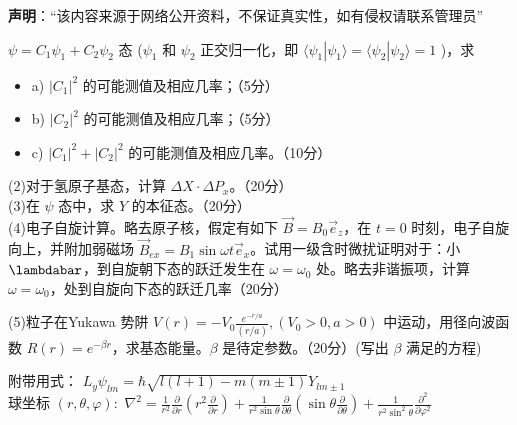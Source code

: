 
\textbf{声明}：“该内容来源于网络公开资料，不保证真实性，如有侵权请联系管理员”

\begin{enumerate}
     $\psi = C_1 \psi_1 + C_2 \psi_2$ 态 ($\psi_1$ 和 $\psi_2$ 正交归一化，即 $\langle \psi_1 | \psi_1 \rangle = \langle \psi_2 | \psi_2 \rangle = 1$ )，求
    \begin{itemize}
    \item a) $|C_1|^2$ 的可能测值及相应几率；（5分）
    \item b) $|C_2|^2$ 的可能测值及相应几率；（5分）
    \item c) $|C_1|^2 + |C_2|^2$ 的可能测值及相应几率。（10分）
   \end{itemize}
 
    (2)对于氢原子基态，计算 $\Delta X \cdot \Delta P_x$。（20分）\\
    (3)在 $\psi$ 态中，求 $Y$ 的本征态。（20分）\\
    (4)电子自旋计算。略去原子核，假定有如下 $\vec{B} = B_0 \vec{e}_z$，在 $t=0$ 时刻，电子自旋向上，并附加弱磁场 $\vec{B}_{ex} = B_1 \sin \omega t \vec{e}_x$。试用一级含时微扰证明对于：小 $\lambdabar$，到自旋朝下态的跃迁发生在 $\omega = \omega_0$ 处。略去非谐振项，计算 $\omega = \omega_0$，处到自旋向下态的跃迁几率（20分） 
     \end{enumerate}
     
    (5)粒子在Yukawa 势阱 $V(r) = -V_0 \frac{e^{-r/a}}{(r/a)}, \left( V_0 > 0, a > 0 \right)$
    中运动，用径向波函数 $R(r) = e^{-\beta r}$，求基态能量。$\beta$ 是待定参数。（20分）(写出 $\beta$ 满足的方程)
    
    附带用式：
$L_y \psi_{lm} = \hbar \sqrt{l(l+1)-m(m\pm 1)} Y_{lm \pm 1}$\\
$\text{球坐标 } (r, \theta, \varphi):$
$\nabla^2 = \frac{1}{r^2} \frac{\partial}{\partial r} \left( r^2 \frac{\partial}{\partial r} \right) + \frac{1}{r^2 \sin \theta} \frac{\partial}{\partial \theta} \left( \sin \theta \frac{\partial}{\partial \theta} \right) + \frac{1}{r^2 \sin^2 \theta} \frac{\partial^2}{\partial \varphi^2}$



